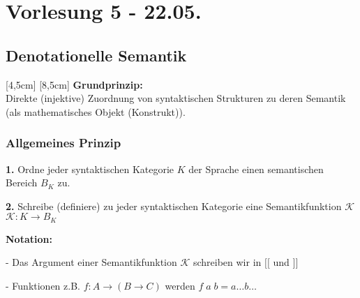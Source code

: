 \section{Vorlesung 5 - 22.05.}
\subsection{Denotationelle Semantik}
[4,5cm]
[8,5cm]
\textbf{Grundprinzip:} \\Direkte (injektive) Zuordnung von syntaktischen Strukturen zu deren Semantik (als mathematisches Objekt (Konstrukt)).
\subsubsection{Allgemeines Prinzip}
	\begin{compactitem}
		\item[\textbf{1.}] Ordne jeder syntaktischen Kategorie $K$ der Sprache einen semantischen Bereich $B_K$ zu.
		\item[\textbf{2.}] Schreibe (definiere) zu jeder syntaktischen Kategorie eine Semantikfunktion $\mathcal{K}$\\
		$\mathcal{K}:K \rightarrow B_K$
	\end{compactitem}
	\textbf{Notation:}
	\begin{compactitem}
		\item[-] Das Argument einer Semantikfunktion $\mathcal{K}$ schreiben wir in $
[\![$ und $]\!]$
		\item[-] Funktionen z.B. $f: A \rightarrow (B \rightarrow C)$ werden $f\;a\;b = a \dots b \dots $ 
	\end{compactitem}

